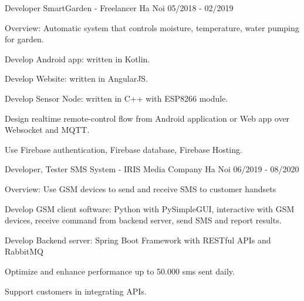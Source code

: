 

\begin{cventries}


    \cventry
    {Developer} %
    {SmartGarden - Freelancer} %
    {Ha Noi} %
    {05/2018 - 02/2019} %
    {
        \begin{cvitems} %
            \item {Overview: Automatic system that controls moisture, temperature, water pumping for garden. }
            \item {Develop Android app: written in Kotlin. }
            \item {Develop Website: written in AngularJS. }
            \item {Develop Sensor Node: written in C++ with ESP8266 module. }
            \item {Design realtime remote-control flow from Android application or Web app over Websocket and MQTT.}
            \item {Use Firebase authentication, Firebase database, Firebase Hosting.}
        \end{cvitems}
    }

    \cventry
    {Developer, Tester} %
    {SMS System - IRIS Media Company} %
    {Ha Noi} %
    {06/2019 - 08/2020} %
    {
        \begin{cvitems} %
            \item {Overview: Use GSM devices to send and receive SMS to customer handsets}
            \item {Develop GSM client software: Python with PySimpleGUI, interactive with GSM devices, receive command from backend server, send SMS and report results.}
            \item {Develop Backend server: Spring Boot Framework with RESTful APIs and RabbitMQ}
            \item {Optimize and enhance performance up to 50.000 sms sent daily. }
            \item {Support customers in integrating APIs.}
        \end{cvitems}
    }


\end{cventries}
